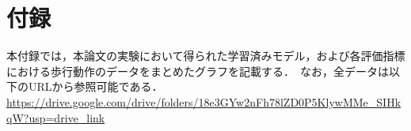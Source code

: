 \appendix

\renewcommand{\thechapter}{\Alph{chapter}}

\chapter{付録} 本付録では，本論文の実験において得られた学習済みモデル，および各評価指標における歩行動作のデータをまとめたグラフを記載する．\ なお，全データは以下のURLから参照可能である．\\
\url{https://drive.google.com/drive/folders/18e3GYw2nFh78lZD0P5KlywMMe_SIHkqW?usp=drive_link}

%
%
%
%
%
%

